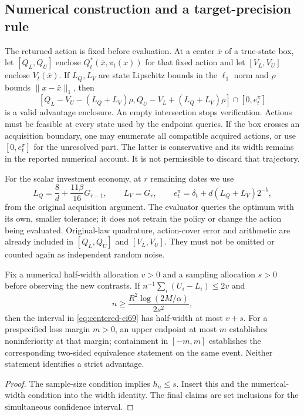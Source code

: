 \subsection{Numerical construction and a target-precision rule}
The returned action is fixed before evaluation. At a center $\bar x$ of a true-state box, let $[Q_L,Q_U]$ enclose $Q_t^*(\bar x,\pi_t(x))$ for that fixed action and let $[V_L,V_U]$ enclose $V_t(\bar x)$. If $L_Q,L_V$ are state Lipschitz bounds in the $\ell_1$ norm and $\rho$ bounds $\|x-\bar x\|_1$, then
\begin{equation}\label{eq:advantage-box69}
 [Q_L-V_U-(L_Q+L_V)\rho,
   Q_U-V_L+(L_Q+L_V)\rho]\cap[0,e_t^\pi]
\end{equation}
is a valid advantage enclosure. An empty intersection stops verification. Actions must be feasible at every state used by the endpoint queries. If the box crosses an acquisition boundary, one may enumerate all compatible acquired actions, or use $[0,e_t^\pi]$ for the unresolved part. The latter is conservative and its width remains in the reported numerical account. It is not permissible to discard that trajectory.

For the scalar investment economy, at $r$ remaining dates we use
\[
 L_Q=\frac8d+\frac{11\beta}{16}G_{r-1},\qquad L_V=G_r,
 \qquad e_t^\pi=\delta_t+d(L_Q+L_V)2^{-b},
\]
from the original acquisition argument. The evaluator queries the optimum with its own, smaller tolerance; it does not retrain the policy or change the action being evaluated. Original-law quadrature, action-cover error and arithmetic are already included in $[Q_L,Q_U]$ and $[V_L,V_U]$. They must not be omitted or counted again as independent random noise.

\begin{corollary}\label{cor:precision69}
Fix a numerical half-width allocation $v>0$ and a sampling allocation $s>0$ before observing the new contrasts. If $n^{-1}\sum_i(U_i-L_i)\le2v$ and
\[
 n\ge\frac{R^2\log(2M/\alpha)}{2s^2},
\]
then the interval in \eqref{eq:centered-ci69} has half-width at most $v+s$. For a prespecified loss margin $m>0$, an upper endpoint at most $m$ establishes noninferiority at that margin; containment in $[-m,m]$ establishes the corresponding two-sided equivalence statement on the same event. Neither statement identifies a strict advantage.
\end{corollary}
\begin{proof}
The sample-size condition implies $h_n\le s$. Insert this and the numerical-width condition into the width identity. The final claims are set inclusions for the simultaneous confidence interval.
\end{proof}


